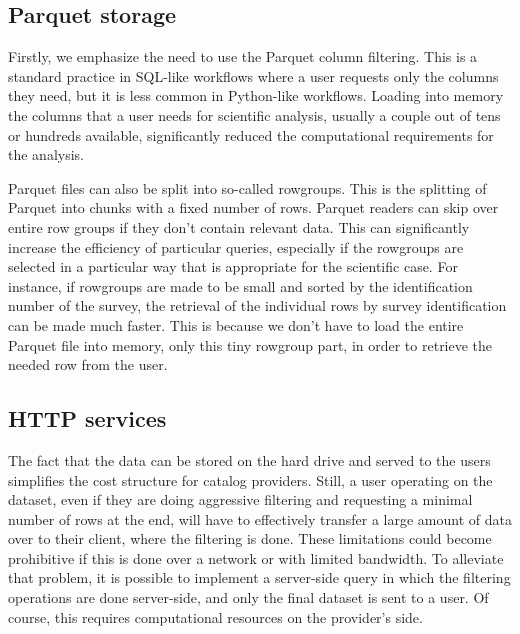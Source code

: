 \documentclass[11pt,a4paper]{ivoa}
\begin{document}
\subsection{Parquet storage}
Firstly, we emphasize the need to use the Parquet column filtering. 
This is a standard practice in SQL-like workflows where a user requests only the columns they need, but it is less common in Python-like workflows. 
Loading into memory the columns that a user needs for scientific analysis, usually a couple out of tens or hundreds available, significantly reduced the computational requirements for the analysis.  \par 
Parquet files can also be split into so-called rowgroups. This is the splitting of Parquet into chunks with a fixed number of rows. 
Parquet readers can skip over entire row groups if they don't contain relevant data. 
This can significantly increase the efficiency of particular queries, especially if the rowgroups are selected in a particular way that is appropriate for the scientific case. 
For instance, if rowgroups are made to be small and sorted by the identification number of the survey, the retrieval of the individual rows by survey identification can be made much faster. 
This is because we don't have to load the entire Parquet file into memory, only this tiny rowgroup part, in order to retrieve the needed row from the user. \par 

\subsection{HTTP services}
The fact that the data can be stored on the hard drive and served to the users simplifies the cost structure for catalog providers. 
Still, a user operating on the dataset, even if they are doing aggressive filtering and requesting a minimal number of rows at the end, will have to effectively transfer a large amount of data over to their client, where the filtering is done. 
These limitations could become prohibitive if this is done over a network or with limited bandwidth. 
To alleviate that problem, it is possible to implement a server-side query in which the filtering operations are done server-side, and only the final dataset is sent to a user. 
Of course, this requires computational resources on the provider's side.
\end{document}
